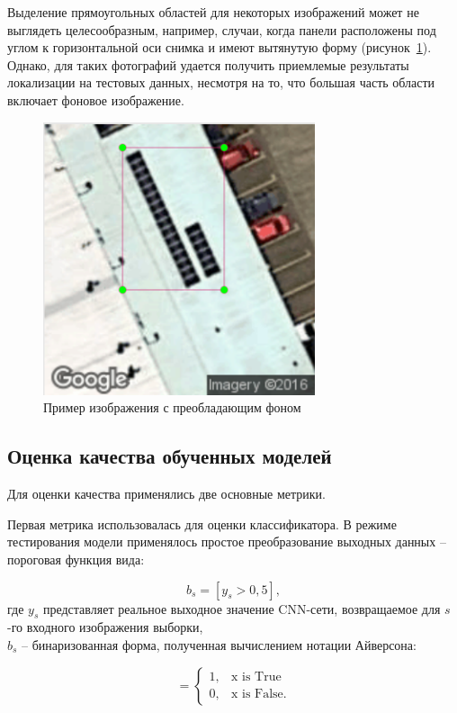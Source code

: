 Выделение прямоугольных областей для некоторых изображений может не выглядеть целесообразным, например, случаи, когда панели расположены под углом к горизонтальной оси снимка и имеют вытянутую форму (рисунок~\ref{fig:background_dominate}). Однако, для таких фотографий удается получить приемлемые результаты локализации на тестовых данных, несмотря на то, что большая часть области включает фоновое изображение.
 
\begin{figure}[ht]
	\centering
	\includegraphics[width=8cm]{man-source/images/ch4/pic4-18.png}
	\caption{Пример изображения с преобладающим фоном}
	\label{fig:background_dominate}
\end{figure}

\subsection{Оценка качества обученных моделей}

Для оценки качества применялись две основные метрики. 

Первая метрика использовалась для оценки классификатора. В режиме тестирования модели применялось простое преобразование выходных данных -- пороговая функция вида:

\begin{equation*}
    b_s = [y_s > 0,5],
\end{equation*}
где $y_s$ представляет реальное выходное значение CNN-сети, возвращаемое для $s$-го входного изображения выборки,\\
$b_s$ -- бинаризованная форма, полученная вычислением нотации Айверсона:

\begin{equation*}
    [x] = 
    \begin{cases}
        1, & \text{x is True} \\
        0, & \text{x is False}.
    \end{cases}
\end{equation*}

